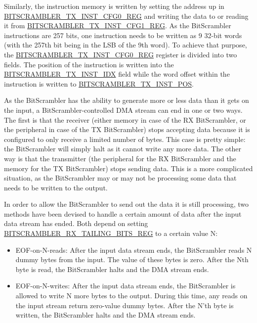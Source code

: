\documentclass[main\_\_EN.tex]{subfiles}
\begin{document}
Similarly, the instruction memory is written by setting the address up in \hyperref[regdesc:BITSCRAMBLERTXINSTCFG0REG]{BITSCRAMBLER\_TX\_INST\_CFG0\_REG} and writing the data to or reading it from \hyperref[regdesc:BITSCRAMBLERTXINSTCFG1REG]{BITSCRAMBLER\_TX\_INST\_CFG1\_REG}. As the BitScrambler instructions are 257 bits, one instruction needs to be written as 9 32-bit words (with the 257th bit being in the LSB of the 9th word). To achieve that purpose, the \hyperref[regdesc:BITSCRAMBLERTXINSTCFG0REG]{BITSCRAMBLER\_TX\_INST\_CFG0\_REG} register is divided into two fields. The position of the instruction is written into the \hyperref[fielddesc:BITSCRAMBLERTXINSTIDX]{BITSCRAMBLER\_TX\_INST\_IDX} field while the word offset within the instruction is written to \hyperref[fielddesc:BITSCRAMBLERTXINSTPOS]{BITSCRAMBLER\_TX\_INST\_POS}.

As the BitScrambler has the ability to generate more or less data than it gets on the input, a BitScrambler-controlled DMA stream can end in one or two ways. The first is that the receiver (either memory in case of the RX BitScrambler, or the peripheral in case of the TX BitScrambler) stops accepting data because it is configured to only receive a limited number of bytes. This case is pretty simple: the BitScrambler will simply halt as it cannot write any more data. The other way is that the transmitter (the peripheral for the RX BitScrambler and the memory for the TX BitScrambler) stops sending data. This is a more complicated situation, as the BitScrambler may or may not be processing some data that needs to be written to the output.

In order to allow the BitScrambler to send out the data it is still processing, two methods have been devised to handle a certain amount of data after the input data stream has ended. Both depend on setting \hyperref[regdesc:BITSCRAMBLERRXTAILINGBITSREG]{BITSCRAMBLER\_RX\_TAILING\_BITS\_REG} to a certain value N:

\begin{itemize}
\item EOF-on-N-reads: After the input data stream ends, the BitScrambler reads N dummy bytes from the input. The value of these bytes is zero. After the Nth byte is read, the BitScrambler halts and the DMA stream ends.

\item EOF-on-N-writes: After the input data stream ends, the BitScrambler is allowed to write N more bytes to the output. During this time, any reads on the input stream return zero-value dummy bytes. After the N'th byte is written, the BitScrambler halts and the DMA stream ends.
\end{itemize}
\end{document}
